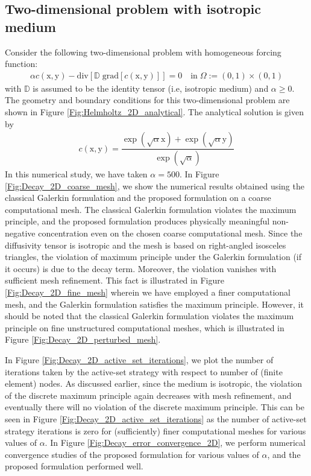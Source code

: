 \documentclass[11pt]{amsart}
\begin{document}
\subsection{Two-dimensional problem with isotropic medium}
Consider the following two-dimensional problem with homogeneous forcing function:
\begin{align}
  \label{Eqn:Helmholtz_2D_equation}
  \alpha c(\mathrm{x},\mathrm{y})- \mathrm{div}[\mathbb{D} \; \mathrm{grad}[c(\mathrm{x},
  \mathrm{y})]] = 0 \quad \mathrm{in} \; \Omega := (0, 1) \times (0, 1) 
\end{align}
with $\mathbb{D}$ is assumed to be the identity tensor (i.e, isotropic medium) and $\alpha 
\geq 0$. The geometry and boundary conditions for this two-dimensional problem are shown in 
Figure \ref{Fig:Helmholtz_2D_analytical}. The analytical solution is given by
\begin{align}
  \label{Eqn:Helmholtz_2D_analytical}
  c(\mathrm{x},\mathrm{y})= \dfrac{\exp(\sqrt{\alpha} \mathrm{x}) + 
    \exp(\sqrt{\alpha} \mathrm{y})}{\exp (\sqrt{\alpha})}
\end{align}
In this numerical study, we have taken $\alpha = 500$. In Figure \ref{Fig:Decay_2D_coarse_mesh}, 
we show the numerical results obtained using the classical Galerkin formulation and the proposed 
formulation on a coarse computational mesh. The classical Galerkin formulation violates the maximum 
principle, and the proposed formulation produces physically meaningful non-negative concentration 
even on the chosen coarse computational mesh. 
Since the diffusivity tensor is isotropic and the mesh is based on right-angled isosceles 
triangles, the violation of maximum principle under the Galerkin formulation (if it occurs) 
is due to the decay term. Moreover, the violation vanishes with sufficient mesh refinement. 
This fact is illustrated in Figure \ref{Fig:Decay_2D_fine_mesh} wherein we have employed 
a finer computational mesh, and the Galerkin formulation satisfies the maximum principle. 
However, it should be noted that the classical Galerkin formulation violates the maximum 
principle on fine unstructured computational meshes, which is illustrated in Figure 
\ref{Fig:Decay_2D_perturbed_mesh}. 

In Figure \ref{Fig:Decay_2D_active_set_iterations}, we plot the number of iterations taken by 
the active-set strategy with respect to number of (finite element) nodes. As discussed earlier, 
since the medium is isotropic, the violation of the discrete maximum principle again decreases 
with mesh refinement, and eventually there will no violation of the discrete maximum principle. 
This can be seen in Figure \ref{Fig:Decay_2D_active_set_iterations} as the number of 
active-set strategy iterations is zero for (sufficiently) finer computational meshes for various 
values of $\alpha$.
In Figure \ref{Fig:Decay_error_convergence_2D}, we perform numerical convergence studies of 
the proposed formulation for various values of $\alpha$, and the proposed formulation performed 
well. 
\end{document}
